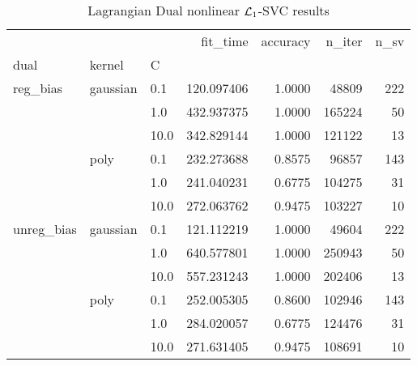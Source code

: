 \begin{table}[H]
\centering
\caption{Lagrangian Dual nonlinear $\protect \mathcal{L}_1$-SVC results}
\label{nonlinear_lagrangian_dual_l1_svc_cv_results}
\begin{tabular}{lllrrrr}
\toprule
           &      &      &    fit\_time &  accuracy &  n\_iter &  n\_sv \\
dual & kernel & C &             &           &         &       \\
\midrule
reg\_bias & gaussian & 0.1  &  120.097406 &    1.0000 &   48809 &   222 \\
           &      & 1.0  &  432.937375 &    1.0000 &  165224 &    50 \\
           &      & 10.0 &  342.829144 &    1.0000 &  121122 &    13 \\
           & poly & 0.1  &  232.273688 &    0.8575 &   96857 &   143 \\
           &      & 1.0  &  241.040231 &    0.6775 &  104275 &    31 \\
           &      & 10.0 &  272.063762 &    0.9475 &  103227 &    10 \\
unreg\_bias & gaussian & 0.1  &  121.112219 &    1.0000 &   49604 &   222 \\
           &      & 1.0  &  640.577801 &    1.0000 &  250943 &    50 \\
           &      & 10.0 &  557.231243 &    1.0000 &  202406 &    13 \\
           & poly & 0.1  &  252.005305 &    0.8600 &  102946 &   143 \\
           &      & 1.0  &  284.020057 &    0.6775 &  124476 &    31 \\
           &      & 10.0 &  271.631405 &    0.9475 &  108691 &    10 \\
\bottomrule
\end{tabular}
\end{table}
